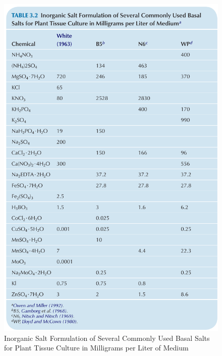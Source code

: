 \documentclass[
  ignorenonframetext,
  aspectratio=169]{beamer}
\begin{document}
\begin{frame}{}
\protect\hypertarget{section-4}{}
\begin{figure}
\includegraphics[width=0.35\linewidth]{../images/is_formulation_mediums} \caption{Inorganic Salt Formulation of Several Commonly Used Basal Salts for Plant Tissue Culture in Milligrams per Liter of Medium}\label{fig:is-formulation}
\end{figure}
\end{frame}
\end{document}
